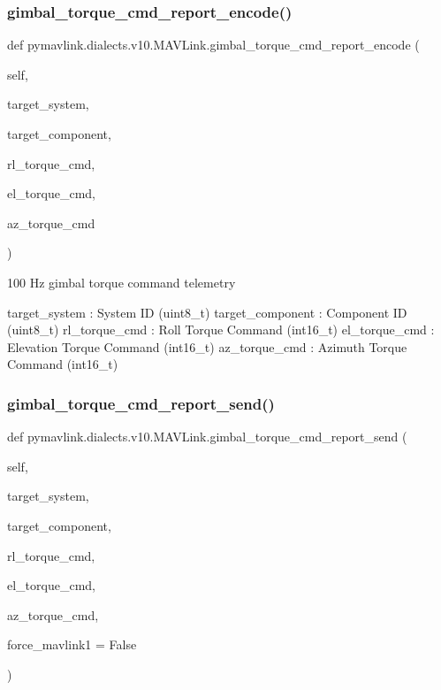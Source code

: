 \begin{DoxyVerb}
\begin{DoxyVerb}
\subsubsection{\texorpdfstring{gimbal\+\_\+torque\+\_\+cmd\+\_\+report\+\_\+encode()}{gimbal\_torque\_cmd\_report\_encode()}}
{\footnotesize\ttfamily def pymavlink.\+dialects.\+v10.\+M\+A\+V\+Link.\+gimbal\+\_\+torque\+\_\+cmd\+\_\+report\+\_\+encode (\begin{DoxyParamCaption}\item[{}]{self,  }\item[{}]{target\+\_\+system,  }\item[{}]{target\+\_\+component,  }\item[{}]{rl\+\_\+torque\+\_\+cmd,  }\item[{}]{el\+\_\+torque\+\_\+cmd,  }\item[{}]{az\+\_\+torque\+\_\+cmd }\end{DoxyParamCaption})}

\begin{DoxyVerb}100 Hz gimbal torque command telemetry

target_system             : System ID (uint8_t)
target_component          : Component ID (uint8_t)
rl_torque_cmd             : Roll Torque Command (int16_t)
el_torque_cmd             : Elevation Torque Command (int16_t)
az_torque_cmd             : Azimuth Torque Command (int16_t)\end{DoxyVerb}
 \mbox{\label{classpymavlink_1_1dialects_1_1v10_1_1MAVLink_af292e66a7ece3fc5638334c75b937646}} 
\subsubsection{\texorpdfstring{gimbal\+\_\+torque\+\_\+cmd\+\_\+report\+\_\+send()}{gimbal\_torque\_cmd\_report\_send()}}
{\footnotesize\ttfamily def pymavlink.\+dialects.\+v10.\+M\+A\+V\+Link.\+gimbal\+\_\+torque\+\_\+cmd\+\_\+report\+\_\+send (\begin{DoxyParamCaption}\item[{}]{self,  }\item[{}]{target\+\_\+system,  }\item[{}]{target\+\_\+component,  }\item[{}]{rl\+\_\+torque\+\_\+cmd,  }\item[{}]{el\+\_\+torque\+\_\+cmd,  }\item[{}]{az\+\_\+torque\+\_\+cmd,  }\item[{}]{force\+\_\+mavlink1 = {\ttfamily False} }\end{DoxyParamCaption})}


\end{DoxyVerb}
\end{DoxyVerb}
